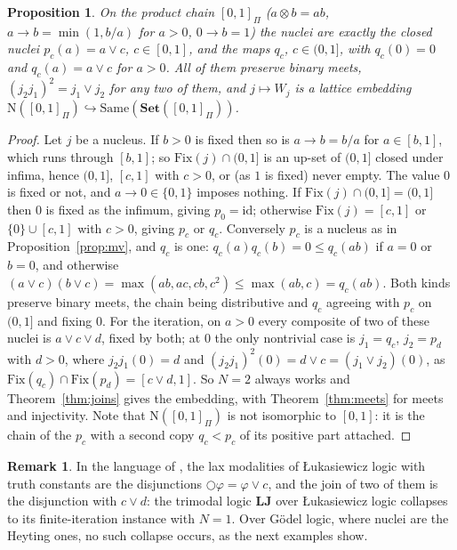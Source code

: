 \documentclass[11pt]{amsart}
\newtheorem{prop}[thm]{Proposition}
\theoremstyle{definition}
\newtheorem{rem}[thm]{Remark}
\newcommand{\Fix}{\mathrm{Fix}}
\newcommand{\Nuc}{\mathrm{N}}
\newcommand{\Same}{\mathrm{Same}}
\newcommand{\FSet}{\mathbf{Set}}
\newcommand{\LLJ}{\mathbf{LJ}}
\newcommand{\lax}{\bigcirc}
\begin{document}
\begin{prop}\label{prop:product}
On the product chain $[0,1]_\Pi$ ($a\otimes b=ab$, $a\to b=\min(1,b/a)$ for
$a>0$, $0\to b=1$) the nuclei are exactly the closed nuclei
$p_c(a)=a\vee c$, $c\in[0,1]$, and the maps $q_c$, $c\in(0,1]$, with
$q_c(0)=0$ and $q_c(a)=a\vee c$ for $a>0$. All of them preserve binary
meets, $(j_2j_1)^2=j_1\vee j_2$ for any two of them, and $j\mapsto W_j$ is a
lattice embedding $\Nuc([0,1]_\Pi)\hookrightarrow\Same(\FSet([0,1]_\Pi))$.
\end{prop}
\begin{proof}
Let $j$ be a nucleus. If $b>0$ is fixed then so is $a\to b=b/a$ for
$a\in[b,1]$, which runs through $[b,1]$; so $\Fix(j)\cap(0,1]$ is an
up-set of $(0,1]$ closed under infima, hence $(0,1]$, $[c,1]$ with $c>0$,
or (as $1$ is fixed) never empty. The value $0$ is fixed or not, and
$a\to0\in\{0,1\}$ imposes nothing. If $\Fix(j)\cap(0,1]=(0,1]$ then $0$ is
fixed as the infimum, giving $p_0=\mathrm{id}$; otherwise $\Fix(j)=[c,1]$
or $\{0\}\cup[c,1]$ with $c>0$, giving $p_c$ or $q_c$. Conversely $p_c$ is a
nucleus as in Proposition~\ref{prop:mv}, and $q_c$ is one: $q_c(a)q_c(b)=0
\le q_c(ab)$ if $a=0$ or $b=0$, and otherwise $(a\vee c)(b\vee c)=\max(ab,ac,
cb,c^2)\le\max(ab,c)=q_c(ab)$. Both kinds preserve binary meets, the
chain being distributive and $q_c$ agreeing with $p_c$ on $(0,1]$ and
fixing $0$. For the iteration, on $a>0$ every composite of two of these
nuclei is $a\vee c\vee d$, fixed by both; at $0$ the only nontrivial case is
$j_1=q_c$, $j_2=p_d$ with $d>0$, where $j_2j_1(0)=d$ and
$(j_2j_1)^2(0)=d\vee c=(j_1\vee j_2)(0)$, as $\Fix(q_c)\cap\Fix(p_d)=[c\vee d,1]$.
So $N=2$ always works and Theorem~\ref{thm:joins} gives the embedding, with
Theorem~\ref{thm:meets} for meets and injectivity. Note that
$\Nuc([0,1]_\Pi)$ is not isomorphic to $[0,1]$: it is the chain of the $p_c$
with a second copy $q_c<p_c$ of its positive part attached.
\end{proof}

\begin{rem}
In the language of \cite{Laxjoin}, the lax modalities of \L ukasiewicz logic
with truth constants are the disjunctions $\lax\varphi=\varphi\vee c$, and
the join of two of them is the disjunction with $c\vee d$: the trimodal
logic $\LLJ$ over \L ukasiewicz logic collapses to its finite-iteration
instance with $N=1$. Over G\"odel logic, where nuclei are the Heyting ones,
no such collapse occurs, as the next examples show.
\end{rem}
\end{document}
